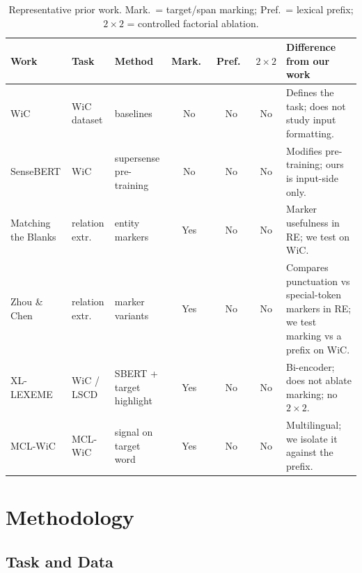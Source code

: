 \documentclass[runningheads]{llncs}
\begin{document}
\begin{table}[t]
\centering
\caption{Representative prior work. Mark.\ = target/span marking; Pref.\ = lexical prefix; $2{\times}2$ = controlled factorial ablation.}
\label{tab:related}
\setlength{\tabcolsep}{3pt}
\footnotesize
\begin{tabular}{>{\raggedright\arraybackslash}p{2.05cm}>{\raggedright\arraybackslash}p{1.6cm}>{\raggedright\arraybackslash}p{1.7cm}ccc >{\raggedright\arraybackslash}p{3.15cm}}
\toprule
Work & Task & Method & Mark.\ & Pref.\ & $2{\times}2$ & Difference from our work\\
\midrule
WiC \cite{pilehvar2019wic} & WiC dataset & baselines & No & No & No & Defines the task; does not study input formatting.\\
SenseBERT \cite{levine2020sensebert} & WiC & supersense pre-training & No & No & No & Modifies pre-training; ours is input-side only.\\
Matching the Blanks \cite{soares2019matching} & relation extr.\ & entity markers & Yes & No & No & Marker usefulness in RE; we test on WiC.\\
Zhou \& Chen \cite{zhou2022improved} & relation extr.\ & marker variants & Yes & No & No & Compares punctuation vs special-token markers in RE; we test marking vs a prefix on WiC.\\
XL-LEXEME \cite{cassotti2023xllexeme} & WiC / LSCD & SBERT + target highlight & Yes & No & No & Bi-encoder; does not ablate marking; no $2{\times}2$.\\
MCL-WiC \cite{martelli2021mclwic,gupta2021mcliitk} & MCL-WiC & signal on target word & Yes & No & No & Multilingual; we isolate it against the prefix.\\
\bottomrule
\end{tabular}
\end{table}

\section{Methodology}
\label{sec:method}

\subsection{Task and Data}
\label{subsec:task}
\end{document}
